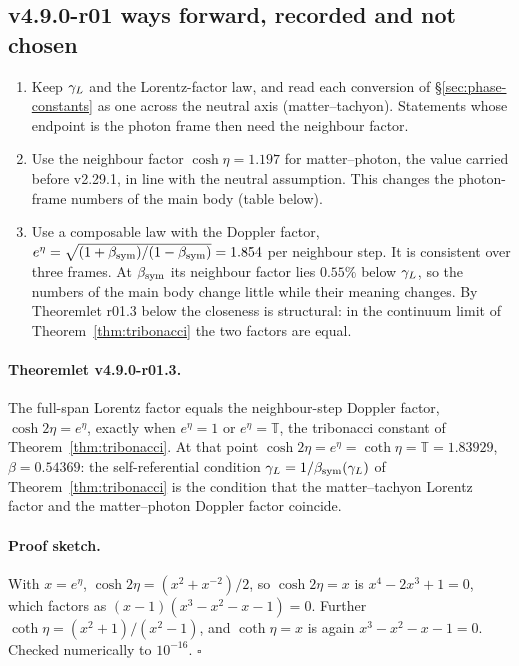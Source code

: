 \subsection*{v4.9.0-r01 ways forward, recorded and not chosen}
\label{subsec:v490-r01-ways}

\begin{enumerate}[leftmargin=2em]
\item[(A)] Keep \(\gamma_L\) and the Lorentz-factor law, and read each conversion of \S\ref{sec:phase-constants} as one across
the neutral axis (matter--tachyon).  Statements whose endpoint is the photon frame then need the neighbour factor.
\item[(B)] Use the neighbour factor \(\cosh\eta=1.197\) for matter--photon, the value carried before v2.29.1, in line with
the neutral assumption.  This changes the photon-frame numbers of the main body (table below).
\item[(C)] Use a composable law with the Doppler factor, \(e^{\eta}=\sqrt{(1+\beta_{\mathrm{sym}})/(1-\beta_{\mathrm{sym}})}=1.854\) per neighbour step.
It is consistent over three frames.  At \(\beta_{\mathrm{sym}}\) its neighbour factor lies \(0.55\%\) below \(\gamma_L\), so the numbers of the
main body change little while their meaning changes.  By Theoremlet r01.3 below the closeness is structural: in the
continuum limit of Theorem~\ref{thm:tribonacci} the two factors are equal.
\end{enumerate}

\paragraph{Theoremlet v4.9.0-r01.3.}
The full-span Lorentz factor equals the neighbour-step Doppler factor, \(\cosh2\eta=e^{\eta}\), exactly when \(e^{\eta}=1\)
or \(e^{\eta}=\mathbb T\), the tribonacci constant of Theorem~\ref{thm:tribonacci}.  At that point
\(\cosh2\eta=e^{\eta}=\coth\eta=\mathbb T=1.83929\), \(\beta=0.54369\): the self-referential condition
\(\gamma_L=1/\beta_{\mathrm{sym}}(\gamma_L)\) of Theorem~\ref{thm:tribonacci} is the condition that the matter--tachyon Lorentz factor and the
matter--photon Doppler factor coincide.

\paragraph{Proof sketch.}
With \(x=e^{\eta}\), \(\cosh2\eta=(x^2+x^{-2})/2\), so \(\cosh2\eta=x\) is \(x^4-2x^3+1=0\), which factors as
\((x-1)(x^3-x^2-x-1)=0\).  Further \(\coth\eta=(x^2+1)/(x^2-1)\), and \(\coth\eta=x\) is again \(x^3-x^2-x-1=0\).
Checked numerically to \(10^{-16}\).  \(\square\)

